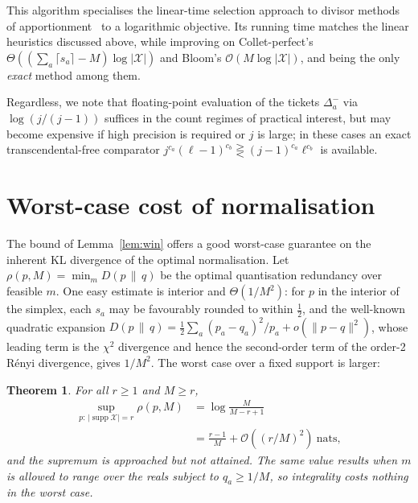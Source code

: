 \documentclass[final,5p]{elsarticle}
\newtheorem{theorem}{Theorem}
\DeclareMathOperator{\supp}{supp}
\begin{document}
This algorithm specialises the linear-time selection approach to divisor
methods of apportionment~\cite{ChengEppstein2014,ReitzigWild2023} to
a logarithmic objective. Its running time matches the linear heuristics discussed above, while improving
on Collet-perfect's $\Theta\!\left((\sum_a\lceil s_a\rceil-M)\log |\mathcal X|\right)$
and Bloom's $\mathcal{O}(M\log |\mathcal X|)$, and being the only \textit{exact}
method among them.

Regardless, we note that floating-point evaluation of the tickets $\Delta^-_a$ via $\log(j/(j-1))$ suffices in the count regimes of practical interest, but may become expensive if high precision is required or $j$ is large; in these cases an
exact transcendental-free comparator $j^{c_a}(\ell-1)^{c_b}\gtreqless(j-1)^{c_a}\ell^{c_b}$ is available.

\section{Worst-case cost of normalisation}

The bound of Lemma~\ref{lem:win} offers a good worst-case guarantee on the inherent KL divergence of the optimal normalisation. Let $\rho(p,M)=\min_m D(p\,\|\,q)$ be the optimal quantisation redundancy over feasible $m$. One easy estimate is interior and $\Theta(1/M^2)$: for $p$ in the interior of the simplex, each $s_a$ may be favourably rounded to within $\tfrac12$, and the well-known quadratic expansion $D(p\,\|\,q)=\tfrac12\sum_a(p_a-q_a)^2/p_a+o(\lVert p-q\rVert^2)$, whose leading term is the $\chi^2$ divergence and hence the second-order term of the order-2 Rényi divergence, gives $1/M^2$. The worst case over a fixed support is larger:

\begin{theorem}
\label{thm:redundancy}
For all $r\ge1$ and $M\ge r$,
\begin{equation}
\begin{aligned}
   \sup_{p:\,|\supp \mathcal X|=r}\rho(p,M)
   &=\log\frac{M}{M-r+1} \\
   &=\frac{r-1}{M}+\mathcal{O}\!\left((r/M)^2\right)\ \text{nats},
\end{aligned}
\end{equation}
and the supremum is approached but not attained. The same value results when $m$
is allowed to range over the reals subject to $q_a\ge1/M$, so integrality costs
nothing in the worst case.
\end{theorem}
\end{document}
